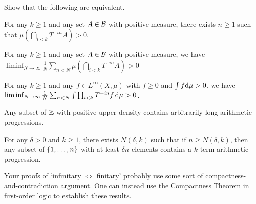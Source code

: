 \documentclass[reqno, twoside]{article}
\begin{document}
    \begin{exercise}
        Show that the following are equivalent.
        \begin{center}
            \begin{minipage}{0.95\textwidth}
                \begin{theorem*}
                    For any $k\geq1$ and any set $A\in\mathcal{B}$ with positive measure, there exists $n\geq1$ such that $\mu(\bigcap_{i<k}T^{-in}A)>0$.
                \end{theorem*}
                \begin{theorem*}
                    For any $k\geq1$ and any set $A\in\mathcal{B}$ with positive measure, we have $\liminf_{N\to\infty}\frac{1}{N}\sum_{n<N}\mu(\bigcap_{i<k}T^{-in}A)>0$
                \end{theorem*}
                \begin{theorem*}
                    For any $k\geq1$ and any $f\in L^\infty(X,\mu)$ with $f\geq0$ and $\int f\mathrm{d}\mu>0$, we have $\liminf_{N\to\infty}\frac{1}{N}\sum_{n<N}\int\prod_{i<k}T^{-in}f\,\mathrm{d}\mu>0$.
                \end{theorem*}
                \begin{theorem*}
                    Any subset of $\mathbb{Z}$ with positive upper density contains arbitrarily long arithmetic progressions.
                \end{theorem*}
                \begin{theorem*}
                    For any $\delta>0$ and $k\geq1$, there exists $N(\delta,k)$ such that if $n\geq N(\delta,k)$, then any subset of $\left\{1,\dots,n\right\}$ with at least $\delta n$ elements contains a $k$-term arithmetic progression.
                \end{theorem*}
            \end{minipage}
        \end{center}
    \end{exercise}

    \begin{remark*}
        Your proofs of `infinitary $\Leftrightarrow$ finitary' probably use some sort of compactness-and-contradiction argument. One can instead use the Compactness Theorem in first-order logic to establish these results.
    \end{remark*}
\end{document}

